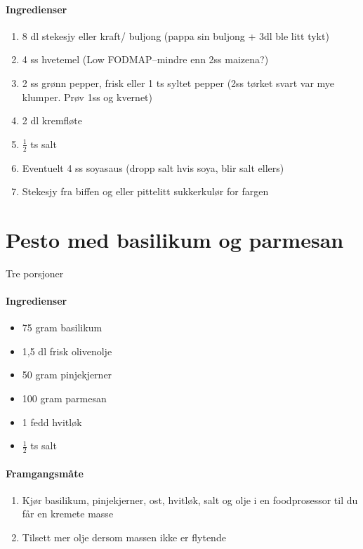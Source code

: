 \documentclass[12pt,a4paper]{book}
\begin{document}
\paragraph{Ingredienser}
\begin{enumerate}[noitemsep]
	\item 8 dl stekesjy eller kraft/ buljong (pappa sin buljong + 3dl ble litt tykt)
	\item 4 ss hvetemel (Low FODMAP--mindre enn 2ss maizena?)
	\item 2 ss grønn pepper, frisk eller 1 ts syltet pepper (2ss tørket svart var mye klumper.  Prøv 1ss og kvernet)
	\item 2 dl kremfløte
	\item  $\frac{1}{2}$  ts salt
	\item Eventuelt 4 ss soyasaus (dropp salt hvis soya, blir salt ellers)
	\item Stekesjy fra biffen og eller pittelitt sukkerkulør for fargen
\end{enumerate}
\clearpage{}
\clearpage{}\section{﻿Pesto med basilikum og parmesan}
Tre porsjoner

\paragraph{Ingredienser}
\begin{itemize}[noitemsep]
	\item 75 gram basilikum
	\item 1,5 dl frisk olivenolje
	\item 50 gram pinjekjerner
	\item 100 gram parmesan
	\item 1 fedd hvitløk
	\item $\frac{1}{2}$ ts salt
\end{itemize}

\paragraph{Framgangsmåte}
\begin{enumerate}[noitemsep]
	\item Kjør basilikum, pinjekjerner, ost, hvitløk, salt og olje i en foodprosessor til du får en kremete masse
	\item Tilsett mer olje dersom massen ikke er flytende
\end{enumerate}
\end{document}
